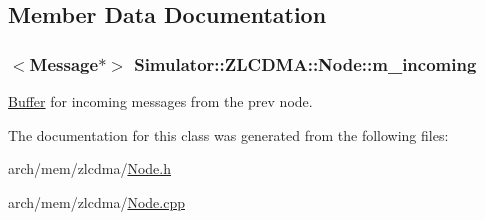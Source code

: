\subsection{Member Data Documentation}
\hypertarget{class_simulator_1_1_z_l_c_d_m_a_1_1_node_a033d8f12b4fcb82e41b7dfe5dcb6b828}{
\subsubsection[{m\+\_\+incoming}]{$<${\bf Message}$\ast$$>$ Simulator\+::\+Z\+L\+C\+D\+M\+A\+::\+Node\+::m\+\_\+incoming\hspace{0.3cm}{\ttfamily [protected]}}}\label{class_simulator_1_1_z_l_c_d_m_a_1_1_node_a033d8f12b4fcb82e41b7dfe5dcb6b828}


\hyperlink{class_simulator_1_1_buffer}{Buffer} for incoming messages from the prev node. 



The documentation for this class was generated from the following files\+:\begin{DoxyCompactItemize}
\item 
arch/mem/zlcdma/\hyperlink{zlcdma_2_node_8h}{Node.\+h}\item 
arch/mem/zlcdma/\hyperlink{zlcdma_2_node_8cpp}{Node.\+cpp}\end{DoxyCompactItemize}
